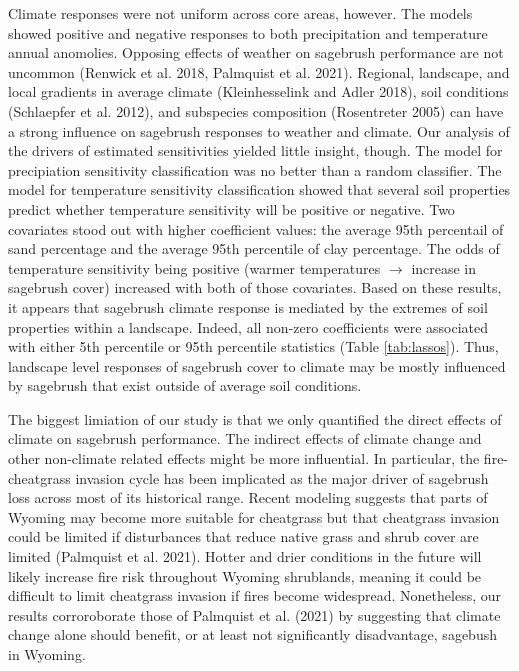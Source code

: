 \documentclass[
  12pt,
]{article}
\begin{document}
Climate responses were not uniform across core areas, however.
The models showed positive and negative responses to both precipitation and temperature annual anomolies.
Opposing effects of weather on sagebrush performance are not uncommon (Renwick et al. 2018, Palmquist et al. 2021).
Regional, landscape, and local gradients in average climate (Kleinhesselink and Adler 2018), soil conditions (Schlaepfer et al. 2012), and subspecies composition (Rosentreter 2005) can have a strong influence on sagebrush responses to weather and climate.
Our analysis of the drivers of estimated sensitivities yielded little insight, though.
The model for precipiation sensitivity classification was no better than a random classifier.
The model for temperature sensitivity classification showed that several soil properties predict whether temperature sensitivity will be positive or negative.
Two covariates stood out with higher coefficient values: the average 95th percentail of sand percentage and the average 95th percentile of clay percentage.
The odds of temperature sensitivity being positive (warmer temperatures \(\rightarrow\) increase in sagebrush cover) increased with both of those covariates.
Based on these results, it appears that sagebrush climate response is mediated by the extremes of soil properties within a landscape.
Indeed, all non-zero coefficients were associated with either 5th percentile or 95th percentile statistics (Table \ref{tab:lassos}).
Thus, landscape level responses of sagebrush cover to climate may be mostly influenced by sagebrush that exist outside of average soil conditions.

The biggest limiation of our study is that we only quantified the direct effects of climate on sagebrush performance.
The indirect effects of climate change and other non-climate related effects might be more influential.
In particular, the fire-cheatgrass invasion cycle has been implicated as the major driver of sagebrush loss across most of its historical range.
Recent modeling suggests that parts of Wyoming may become more suitable for cheatgrass but that cheatgrass invasion could be limited if disturbances that reduce native grass and shrub cover are limited (Palmquist et al. 2021).
Hotter and drier conditions in the future will likely increase fire risk throughout Wyoming shrublands, meaning it could be difficult to limit cheatgrass invasion if fires become widespread.
Nonetheless, our results corroroborate those of Palmquist et al. (2021) by suggesting that climate change alone should benefit, or at least not significantly disadvantage, sagebush in Wyoming.
\end{document}
